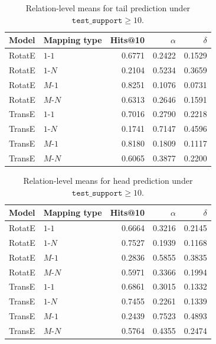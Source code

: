 \begin{table}[!t]
    \centering
    \caption{Relation-level means for tail prediction under
    \(\texttt{test\_support}\geq 10\).}
    \label{tab:mapping-type-tail-summary}
    \small
    \begin{tabular}{llrrr}
        \toprule
        Model & Mapping type & Hits@10 & \(\alpha\) & \(\delta\) \\
        \midrule
        RotatE & \(1\)-\(1\) & 0.6771 & 0.2422 & 0.1529 \\
        RotatE & \(1\)-\(N\) & 0.2104 & 0.5234 & 0.3659 \\
        RotatE & \(M\)-\(1\) & 0.8251 & 0.1076 & 0.0731 \\
        RotatE & \(M\)-\(N\) & 0.6313 & 0.2646 & 0.1591 \\
        TransE & \(1\)-\(1\) & 0.7016 & 0.2790 & 0.2218 \\
        TransE & \(1\)-\(N\) & 0.1741 & 0.7147 & 0.4596 \\
        TransE & \(M\)-\(1\) & 0.8180 & 0.1809 & 0.1117 \\
        TransE & \(M\)-\(N\) & 0.6065 & 0.3877 & 0.2200 \\
        \bottomrule
    \end{tabular}
\end{table}

\begin{table}[!t]
    \centering
    \caption{Relation-level means for head prediction under
    \(\texttt{test\_support}\geq 10\).}
    \label{tab:mapping-type-head-summary}
    \small
    \begin{tabular}{llrrr}
        \toprule
        Model & Mapping type & Hits@10 & \(\alpha\) & \(\delta\) \\
        \midrule
        RotatE & \(1\)-\(1\) & 0.6664 & 0.3216 & 0.2145 \\
        RotatE & \(1\)-\(N\) & 0.7527 & 0.1939 & 0.1168 \\
        RotatE & \(M\)-\(1\) & 0.2836 & 0.5855 & 0.3835 \\
        RotatE & \(M\)-\(N\) & 0.5971 & 0.3366 & 0.1994 \\
        TransE & \(1\)-\(1\) & 0.6861 & 0.3015 & 0.1332 \\
        TransE & \(1\)-\(N\) & 0.7455 & 0.2261 & 0.1339 \\
        TransE & \(M\)-\(1\) & 0.2439 & 0.7523 & 0.4893 \\
        TransE & \(M\)-\(N\) & 0.5764 & 0.4355 & 0.2474 \\
        \bottomrule
    \end{tabular}
\end{table}

